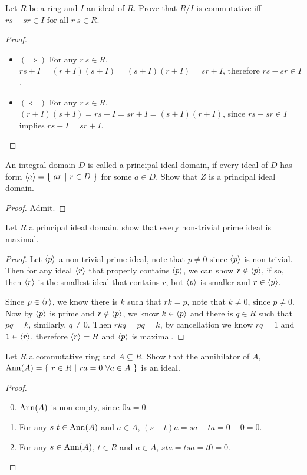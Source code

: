 \documentclass[../main.tex]{subfiles}
\begin{document}
\setcounter{exercise}{49}
\begin{exercise}
  Let $R$ be a ring and $I$ an ideal of $R$.
  Prove that $R/I$ is commutative iff $rs - sr \in I$ for all $r \ s \in R$.
\end{exercise}
\begin{proof}
  ~
  \begin{itemize}
    \item $(\Rightarrow)$ For any $r \ s \in R$,
      $rs + I = (r + I)(s + I) = (s + I)(r + I) = sr + I$,
      therefore $rs - sr \in I$.
    \item $(\Leftarrow)$ For any $r \ s \in R$,
      $(r + I)(s + I) = rs + I = sr + I = (s + I)(r + I)$,
      since $rs - sr \in I$ implies $rs + I = sr + I$.
  \end{itemize}
\end{proof}

\setcounter{exercise}{56}
\begin{exercise}
  An integral domain $D$ is called a principal ideal domain, 
  if every ideal of $D$ has form $\langle a \rangle = \{ \ ar \ | \ r \in D \ \}$ for some $a \in D$.
  Show that $Z$ is a principal ideal domain.
\end{exercise}
\begin{proof}
  Admit.
\end{proof}

\setcounter{exercise}{59}
\begin{exercise}
  Let $R$ a principal ideal domain, show that every non-trivial prime ideal
  is maximal.
\end{exercise}
\begin{proof}
  Let $\langle p \rangle$ a non-trivial prime ideal, note that $p \neq 0$ since $\langle p \rangle$ is non-trivial.
  Then for any ideal $\langle r \rangle$ that properly contains $\langle p \rangle$,
  we can show $r \notin \langle p \rangle$, if so, then $\langle r \rangle$ is the smallest ideal that contains $r$,
  but $\langle p \rangle$ is smaller and $r \in \langle p \rangle$.

  Since $p \in \langle r \rangle$, we know there is $k$ such that $rk = p$, note that $k \neq 0$,
  since $p \neq 0$. Now by $\langle p \rangle$ is prime and $r \notin \langle p \rangle$, we know $k \in \langle p \rangle$
  and there is $q \in R$ such that $pq = k$, similarly, $q \neq 0$.
  Then $rkq = pq = k$, by cancellation we know $rq = 1$ and $1 \in \langle r \rangle$,
  therefore $\langle r \rangle = R$ and $\langle p \rangle$ is maximal.
\end{proof}

\begin{exercise}
  Let $R$ a commutative ring and $A \subseteq R$.
  Show that the annihilator of $A$, $\operatorname{Ann}(A) = \{ \ r \in R \ | \ ra = 0 \ \forall a \in A \ \}$
  is an ideal.
\end{exercise}
\begin{proof}
  ~
  \begin{enumerate}
    \setcounter{enumi}{-1}
    \item $\operatorname{Ann}(A)$ is non-empty, since $0a = 0$.
    \item For any $s \ t \in \operatorname{Ann}(A)$ and $a \in A$, $(s - t)a = sa - ta = 0 - 0 = 0$.
    \item For any $s \in \operatorname{Ann}(A)$, $t \in R$ and $a \in A$, $sta = tsa = t0 = 0$.
  \end{enumerate}
\end{proof}
\end{document}
